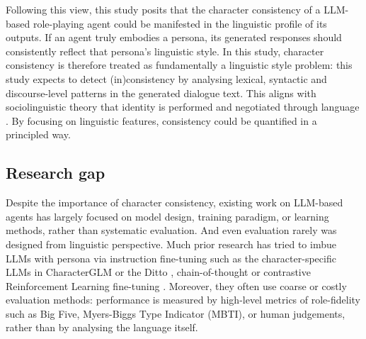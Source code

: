 \documentclass{article}
\begin{document}
Following this view, this study posits that the character consistency of a LLM-based role-playing agent could be manifested in the linguistic profile of its outputs. If an agent truly embodies a persona, its generated responses should consistently reflect that persona's linguistic style. In this study, character consistency is therefore treated as fundamentally a linguistic style problem: this study expects to detect (in)consistency by analysing lexical, syntactic and discourse-level patterns in the generated dialogue text. This aligns with sociolinguistic theory that identity is performed and negotiated through language \citep{bucholtz2005identity}. By focusing on linguistic features, consistency could be quantified in a principled way.

\subsection{Research gap}

Despite the importance of character consistency, existing work on LLM-based agents has largely focused on model design, training paradigm, or learning methods, rather than systematic evaluation. And even evaluation rarely was designed from linguistic perspective. Much prior research has tried to imbue LLMs with persona via instruction fine-tuning such as the character-specific LLMs in CharacterGLM \citep{zhou2023characterglm} or the Ditto \citep{li2021ditto, lu2024large}, chain-of-thought \citep{chae2023dialogue}  or contrastive Reinforcement Learning fine-tuning \citep{shea2023building}. Moreover, they often use coarse or costly evaluation methods: performance is measured by high-level metrics of role-fidelity such as Big Five, Myers-Biggs Type Indicator (MBTI), or human judgements, rather than by analysing the language itself.
\end{document}
